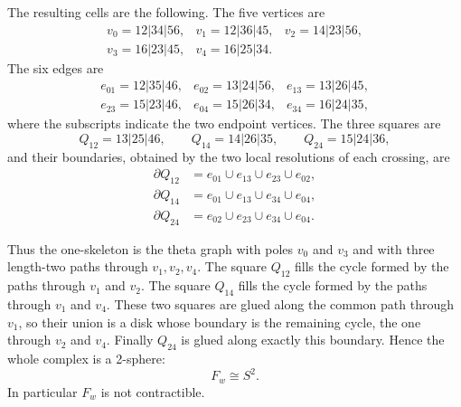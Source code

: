 \documentclass[12pt]{article}
\begin{document}
The resulting cells are the following.  The five vertices are
\[
\begin{array}{lll}
v_0=12|34|56, & v_1=12|36|45, & v_2=14|23|56,\\
v_3=16|23|45, & v_4=16|25|34. &
\end{array}
\]
The six edges are
\[
\begin{array}{lll}
e_{01}=12|35|46, & e_{02}=13|24|56, & e_{13}=13|26|45,\\
e_{23}=15|23|46, & e_{04}=15|26|34, & e_{34}=16|24|35,
\end{array}
\]
where the subscripts indicate the two endpoint vertices.  The three
squares are
\[
        Q_{12}=13|25|46,\qquad
        Q_{14}=14|26|35,\qquad
        Q_{24}=15|24|36,
\]
and their boundaries, obtained by the two local resolutions of each
crossing, are
\[
\begin{aligned}
\partial Q_{12}&=e_{01}\cup e_{13}\cup e_{23}\cup e_{02},\\
\partial Q_{14}&=e_{01}\cup e_{13}\cup e_{34}\cup e_{04},\\
\partial Q_{24}&=e_{02}\cup e_{23}\cup e_{34}\cup e_{04}.
\end{aligned}
\]

Thus the one-skeleton is the theta graph with poles \(v_0\) and \(v_3\)
and with three length-two paths through \(v_1,v_2,v_4\).  The square
\(Q_{12}\) fills the cycle formed by the paths through \(v_1\) and
\(v_2\).  The square \(Q_{14}\) fills the cycle formed by the paths
through \(v_1\) and \(v_4\).  These two squares are glued along the
common path through \(v_1\), so their union is a disk whose boundary is
the remaining cycle, the one through \(v_2\) and \(v_4\).  Finally
\(Q_{24}\) is glued along exactly this boundary.  Hence the whole
complex is a 2-sphere:
\[
        F_w \cong S^2 .
\]
In particular \(F_w\) is not contractible.
\end{document}
